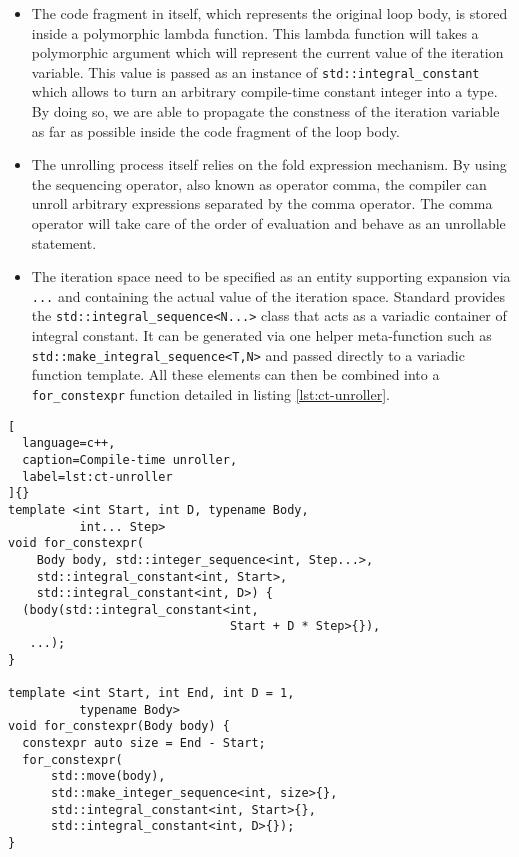 \documentclass[../main]{subfiles}
\begin{document}
\begin{itemize}
\item
The code fragment in itself, which represents
the original loop body, is stored inside a
polymorphic lambda function. This lambda
function will takes a polymorphic argument which
will represent the current value of the iteration
variable. This value is passed as an instance of
\lstinline{std::integral_constant} which allows to
turn an arbitrary compile-time constant integer into
a type. By doing so, we are able to propagate the
constness of the iteration variable as far as possible
inside the code fragment of the loop body.

\item
The unrolling process itself relies on the fold
expression mechanism. By using the sequencing
operator, also known as operator comma, the
compiler can unroll arbitrary expressions separated
by the comma operator. The comma operator will
take care of the order of evaluation and behave as
an unrollable statement.

\item
The iteration space need to be specified
as an entity supporting expansion via \lstinline{...}
and containing the actual value of the
iteration space. Standard \cpp provides the
\lstinline{std::integral_sequence<N...>} class that
acts as a variadic container of integral constant. It
can be generated via one helper meta-function such
as \lstinline{std::make_integral_sequence<T,N>}
and passed directly to a variadic function template.
All these elements can then be combined into a
\lstinline{for_constexpr} function detailed in
listing \ref{lst:ct-unroller}.
\end{itemize}

\begin{lstlisting}[
  language=c++,
  caption=Compile-time unroller,
  label=lst:ct-unroller
]{}
template <int Start, int D, typename Body,
          int... Step>
void for_constexpr(
    Body body, std::integer_sequence<int, Step...>,
    std::integral_constant<int, Start>,
    std::integral_constant<int, D>) {
  (body(std::integral_constant<int,
                               Start + D * Step>{}),
   ...);
}

template <int Start, int End, int D = 1,
          typename Body>
void for_constexpr(Body body) {
  constexpr auto size = End - Start;
  for_constexpr(
      std::move(body),
      std::make_integer_sequence<int, size>{},
      std::integral_constant<int, Start>{},
      std::integral_constant<int, D>{});
}
\end{lstlisting}
\end{document}
